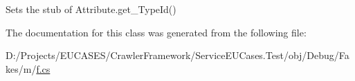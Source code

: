 Sets the stub of Attribute.\-get\-\_\-\-Type\-Id()



The documentation for this class was generated from the following file\-:\begin{DoxyCompactItemize}
\item 
D\-:/\-Projects/\-E\-U\-C\-A\-S\-E\-S/\-Crawler\-Framework/\-Service\-E\-U\-Cases.\-Test/obj/\-Debug/\-Fakes/m/\hyperlink{m_2f_8cs}{f.\-cs}\end{DoxyCompactItemize}
